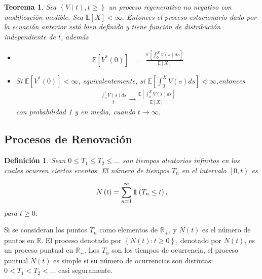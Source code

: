 \documentclass{article}
\newtheorem{Def}{Definición}
\newtheorem{Teo}{Teorema}
\newcommand{\rea}{\mathbb{R}}
\newcommand{\esp}{\mathbb{E}}
\newcommand{\indora}{\mbox{$1$\hspace{-0.8ex}$1$}}
\begin{document}
\begin{Teo}
Sea $\left\{V\left(t\right),t\geq\right\}$ un proceso regenerativo no negativo con modificaci\'on medible. Sea $\esp\left[X\right]<\infty$. Entonces el proceso estacionario dado por la ecuaci\'on anterior est\'a bien definido y tiene funci\'on de distribuci\'on independiente de $t$, adem\'as
\begin{itemize}
\item[i)] \begin{eqnarray*}
\esp\left[V^{*}\left(0\right)\right]&=&\frac{\esp\left[\int_{0}^{X}V\left(s\right)ds\right]}{\esp\left[X\right]}\end{eqnarray*}
\item[ii)] Si $\esp\left[V^{*}\left(0\right)\right]<\infty$, equivalentemente, si $\esp\left[\int_{0}^{X}V\left(s\right)ds\right]<\infty$,entonces
\begin{eqnarray*}
\frac{\int_{0}^{t}V\left(s\right)ds}{t}\rightarrow\frac{\esp\left[\int_{0}^{X}V\left(s\right)ds\right]}{\esp\left[X\right]}
\end{eqnarray*}
con probabilidad 1 y en media, cuando $t\rightarrow\infty$.
\end{itemize}
\end{Teo}

\subsection{Procesos de Renovaci\'on}

\begin{Def}\label{Def.Tn}
Sean $0\leq T_{1}\leq T_{2}\leq \ldots$ son tiempos aleatorios infinitos en los cuales ocurren ciertos eventos. El n\'umero de tiempos $T_{n}$ en el intervalo $\left[0,t\right)$ es

\begin{eqnarray}
N\left(t\right)=\sum_{n=1}^{\infty}\indora\left(T_{n}\leq t\right),
\end{eqnarray}
para $t\geq0$.
\end{Def}

Si se consideran los puntos $T_{n}$ como elementos de $\rea_{+}$, y $N\left(t\right)$ es el n\'umero de puntos en $\rea$. El proceso denotado por $\left\{N\left(t\right):t\geq0\right\}$, denotado por $N\left(t\right)$, es un proceso puntual en $\rea_{+}$. Los $T_{n}$ son los tiempos de ocurrencia, el proceso puntual $N\left(t\right)$ es simple si su n\'umero de ocurrencias son distintas: $0<T_{1}<T_{2}<\ldots$ casi seguramente.
\end{document}
